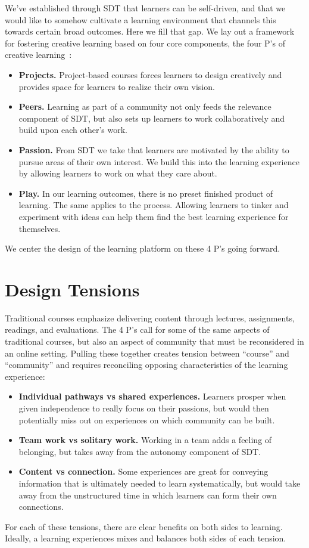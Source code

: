 \documentclass[12pt,twoside,vi]{mitthesis}
\begin{document}
We've established through SDT that learners can be self-driven, and that we would like to somehow cultivate a learning environment that channels this towards certain broad outcomes. Here we fill that gap. We lay out a framework for fostering creative learning based on four core components, the four P's of creative learning~\cite{cultivating}\cite{resnick2014give}\cite{creativelearningfuturework}:
\begin{itemize}
\item \textbf{Projects.} Project-based courses forces learners to design creatively and provides space for learners to realize their own vision.
\item \textbf{Peers.} Learning as part of a community not only feeds the relevance component of SDT, but also sets up learners to work collaboratively and build upon each other's work.
\item \textbf{Passion.} From SDT we take that learners are motivated by the ability to pursue areas of their own interest. We build this into the learning experience by allowing learners to work on what they care about.
\item \textbf{Play.} In our learning outcomes, there is no preset finished product of learning. The same applies to the process. Allowing learners to tinker and experiment with ideas can help them find the best learning experience for themselves.
\end{itemize}
We center the design of the learning platform on these 4 P's going forward. 

\section{Design Tensions}

Traditional courses emphasize delivering content through lectures, assignments, readings, and evaluations. The 4 P's call for some of the same aspects of traditional courses, but also an aspect of community that must be reconsidered in an online setting. Pulling these together creates tension between ``course'' and ``community'' and requires reconciling opposing characteristics of the learning experience:
\begin{itemize}
\item \textbf{Individual pathways vs shared experiences.} Learners prosper when given independence to really focus on their passions, but would then potentially miss out on experiences on which community can be built. 
\item \textbf{Team work vs solitary work.} Working in a team adds a feeling of belonging, but takes away from the autonomy component of SDT.
\item \textbf{Content vs connection.} Some experiences are great for conveying information that is ultimately needed to learn systematically, but would take away from the unstructured time in which learners can form their own connections.
\end{itemize} 
For each of these tensions, there are clear benefits on both sides to learning. Ideally, a learning experiences mixes and balances both sides of each tension.\cite{learningcreativelearning} 
\end{document}
